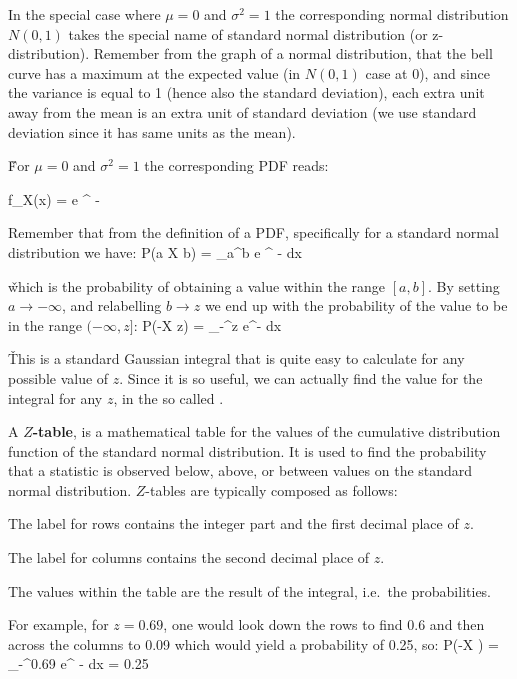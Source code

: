 In the special case where $\mu=0$ and $\sigma^2=1$ the corresponding normal distribution $N(0,1)$ takes the special
name of standard normal distribution (or z-distribution). Remember from the graph of a normal distribution, that the
bell curve has a maximum at the expected value (in $N(0,1)$ case at 0), and since the variance is equal to 1 (hence
also the standard deviation), each extra unit away from the mean is an extra unit of standard deviation (we use
standard deviation since it has same units as the mean).

\v
For $\mu=0$ and $\sigma^2=1$ the corresponding PDF reads:

\bse
f_{X}(x) =  e ^ {-}
\ese
\ed

Remember that from the definition of a PDF, specifically for a standard normal distribution we have:
\bse
P(a \leq X \leq b) =  \int_{a}^{b} e ^ {-} dx
\ese

\v

which is the probability of obtaining a value within the range $[a,b]$. By setting $a \to -\infty$, and relabelling
$b \to z$ we end up with the probability of the value to be in the range $ (-\infty, z]$:
\bse
P(-\infty \leq X \leq z) =  \int_{-\infty}^{z} e^{-} dx
\ese

\v

This is a standard Gaussian integral that is quite easy to calculate for any possible value of $z$. Since it is so
useful, we can actually find the value for the integral for any $z$, in the so called .

\bd[$Z$-Table]
A \textbf{$Z$-table}, is a mathematical table for the values of the cumulative distribution function of the standard
normal distribution. It is used to find the probability that a statistic is observed below, above, or between values
on the standard normal distribution. $Z$-tables are typically composed as follows:
\bit
\item The label for rows contains the integer part and the first decimal place of $z$.
\item The label for columns contains the second decimal place of $z$.
\item The values within the table are the result of the integral, i.e.\ the probabilities.
\eit
\ed

For example, for $z=0.69$, one would look down the rows to find 0.6 and then across the columns to 0.09 which would
yield a probability of 0.25, so:
\bse
P(-\infty \leq X ) =  \int_{-\infty}^{0.69} e^ {-} dx = 0.25
\ese

